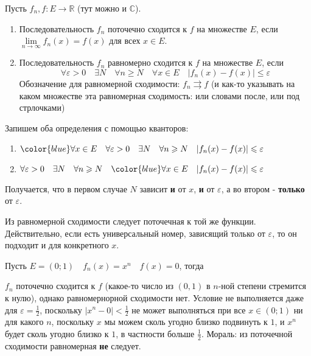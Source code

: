 
\begin{definition} \thmslashn
  
  Пусть $f_n, f \colon E \to \mathbb{R}$ (тут можно и $\mathbb{C}$).
  \begin{enumerate}
  \item Последовательность $f_n$ поточечно сходится к $f$ на множестве $E$, если $\lim\limits_{n\to\infty}f_n(x) = f(x)$ для всех $x\in E$.
  \item Последовательность $f_n$ равномерно сходится к $f$ на множестве $E$, если
    $$\forall \varepsilon > 0 \quad \exists N \quad \forall n \geqslant N\quad \forall x \in E\quad |f_n(x) - f(x)|\leqslant \varepsilon$$
    Обозначение для равномерной сходимости: $f_n\rightrightarrows f$ (и как-то указывать на каком множестве эта равномерная сходимость: или словами после, или под стрлочками)
    
\end{enumerate}
\end{definition}
\begin{remark} \thmslashn
  
  Запишем оба определения с помощью кванторов:
  \begin{enumerate}
  \item ${\color{blue}\forall x \in E} \quad \forall \varepsilon > 0 \quad \exists N \quad \forall n \geqslant N\quad |f_n(x) - f(x)|\leqslant \varepsilon$
  \item $\forall \varepsilon > 0 \quad \exists N \quad \forall n \geqslant N\quad{\color{blue}\forall x \in E} \quad  |f_n(x) - f(x)|\leqslant \varepsilon$
  \end{enumerate}
  Получается, что в первом случае $N$ зависит \textbf{и} от $x$, \textbf{и} от $\varepsilon$, а во втором - \textbf{только} от $\varepsilon$. 
\end{remark}
\begin{remark} \thmslashn
  
  Из равномерной сходимости следует поточечная к той же функции. Действительно, если есть универсальный номер, зависящий только от $\varepsilon$, то он подходит и для конкретного $x$.
\end{remark}
\begin{example} \thmslashn

  Пусть $E = (0; 1)\quad f_n(x) = x^n\quad f(x) = 0$, тогда

  $f_n$ поточечно сходится к $f$ (какое-то число из $(0, 1)$ в $n$-ной степени стремится к нулю), однако равномернорной сходимости нет. Условие не выполняется даже для $\varepsilon = \frac{1}{2}$, поскольку $|x^n - 0| < \frac{1}{2}$ не может выполняться при все $x\in(0;1)$ ни для какого $n$, поскольку $x$ мы можем сколь угодно близко подвинуть к $1$, и $x^n$ будет сколь угодно близко к $1$, в частности больше $\frac{1}{2}$.
  Мораль: из поточечной сходимости равномерная \textbf{не} следует.
\end{example}
